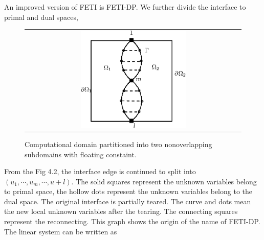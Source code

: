 An improved version of FETI is FETI-DP. We further divide the interface to primal and dual spaces,

\begin{figure}[h]
	\centering
	\begin{tabular}{c}
		\includegraphics[width=0.5\textwidth]{./pics/feti2}
	\end{tabular}
	\caption{\footnotesize Computational domain partitioned into two nonoverlapping subdomains with floating constaint.}
\end{figure}

From the Fig 4.2, the interface edge is continued to split into $ (u_1, \cdots, u_m, \cdots, u+l) $. The solid squares represent the unknown variables belong to primal space, the hollow dots represent the unknown variables belong to the dual space. The original interface is partially teared. The curve and dots mean the new local unknown variables after the tearing. The connecting squares represent the reconnecting. This graph shows the origin of the name of FETI-DP. The linear system can be written as

